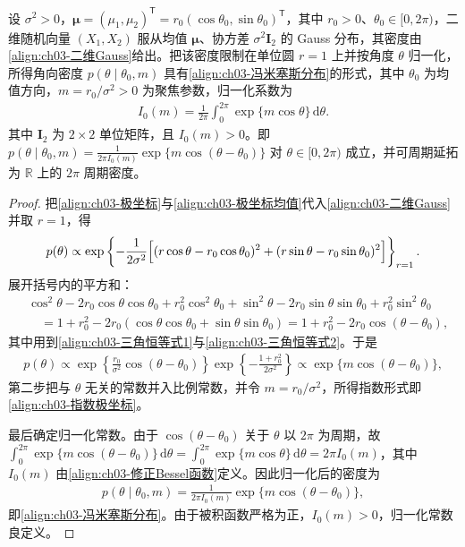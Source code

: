 \documentclass[../../main.tex]{subfiles}
\begin{document}
\begin{theorem}\label{theorem:ch03-冯米塞斯分布}
设 $\sigma^{2}>0$，$\boldsymbol{\mu}=(\mu_1,\mu_2)^{\mathsf{T}}=r_0(\cos\theta_0,\sin\theta_0)^{\mathsf{T}}$，其中 $r_0>0$、$\theta_0\in[0,2\pi)$，二维随机向量 $(X_1,X_2)$ 服从均值 $\boldsymbol{\mu}$、协方差 $\sigma^{2}\boldsymbol{I}_{2}$ 的 Gauss 分布，其密度由\eqref{align:ch03-二维Gauss}给出。把该密度限制在单位圆 $r=1$ 上并按角度 $\theta$ 归一化，所得角向密度 $p(\theta\mid\theta_0,m)$ 具有\eqref{align:ch03-冯米塞斯分布}的形式，其中 $\theta_0$ 为均值方向，$m=r_0/\sigma^{2}>0$ 为聚焦参数，归一化系数为
\begin{align}
I_0(m)=\frac{1}{2\pi}\int_{0}^{2\pi}\exp\{m\cos\theta\}\,\mathrm{d}\theta.
\label{align:ch03-修正Bessel函数}
\end{align}
其中 $\boldsymbol{I}_{2}$ 为 $2\times2$ 单位矩阵，且 $I_0(m)>0$。即 $p(\theta\mid\theta_0,m)=\frac{1}{2\pi I_0(m)}\exp\{m\cos(\theta-\theta_0)\}$ 对 $\theta\in[0,2\pi)$ 成立，并可周期延拓为 $\mathbb{R}$ 上的 $2\pi$ 周期密度。
\end{theorem}
\begin{proof}
把\eqref{align:ch03-极坐标}与\eqref{align:ch03-极坐标均值}代入\eqref{align:ch03-二维Gauss}并取 $r=1$，得
\begin{align*}
p(\theta)\propto\exp\left\{-\frac{1}{2\sigma^{2}}\Bigl[(r\cos\theta-r_0\cos\theta_0)^{2}+(r\sin\theta-r_0\sin\theta_0)^{2}\Bigr]\right\}_{r=1}.
\end{align*}
展开括号内的平方和：
\begin{align*}
&\cos^{2}\theta-2r_0\cos\theta\cos\theta_0+r_0^{2}\cos^{2}\theta_0+\sin^{2}\theta-2r_0\sin\theta\sin\theta_0+r_0^{2}\sin^{2}\theta_0\\
&\quad=1+r_0^{2}-2r_0(\cos\theta\cos\theta_0+\sin\theta\sin\theta_0)=1+r_0^{2}-2r_0\cos(\theta-\theta_0),
\end{align*}
其中用到\eqref{align:ch03-三角恒等式1}与\eqref{align:ch03-三角恒等式2}。于是
\begin{align*}
p(\theta)\propto\exp\left\{\frac{r_0}{\sigma^{2}}\cos(\theta-\theta_0)\right\}\exp\left\{-\frac{1+r_0^{2}}{2\sigma^{2}}\right\}\propto\exp\{m\cos(\theta-\theta_0)\},
\end{align*}
第二步把与 $\theta$ 无关的常数并入比例常数，并令 $m=r_0/\sigma^{2}$，所得指数形式即\eqref{align:ch03-指数极坐标}。

最后确定归一化常数。由于 $\cos(\theta-\theta_0)$ 关于 $\theta$ 以 $2\pi$ 为周期，故 $\int_0^{2\pi}\exp\{m\cos(\theta-\theta_0)\}\,\mathrm{d}\theta=\int_0^{2\pi}\exp\{m\cos\theta\}\,\mathrm{d}\theta=2\pi I_0(m)$，其中 $I_0(m)$ 由\eqref{align:ch03-修正Bessel函数}定义。因此归一化后的密度为
\begin{align*}
p(\theta\mid\theta_0,m)=\frac{1}{2\pi I_0(m)}\exp\{m\cos(\theta-\theta_0)\},
\end{align*}
即\eqref{align:ch03-冯米塞斯分布}。由于被积函数严格为正，$I_0(m)>0$，归一化常数良定义。
\end{proof}
\end{document}
